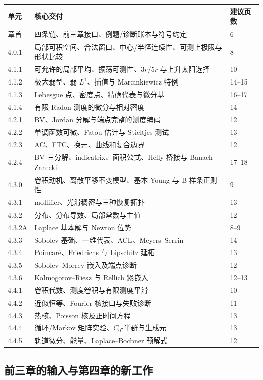 \documentclass[11pt,a4paper]{ctexart}
\begin{document}
\begin{longtable}{p{}p{}p{}}
\toprule
单元 & 核心交付 & 建议页数\\
\midrule
章首 & 四条链、前三章接口、例题/诊断账本与符号约定 & 6\\
4.0.1 & 局部可积空间、合法窗口、中心/半径连续性、可测上极限与形状比较 & 8\\
4.1.1 & 可允许的局部平均、振荡可测性、$3r/5r$ 与上升太阳选择 & 10\\
4.1.2 & 极大弱型、弱 $L^1$、插值与 Marcinkiewicz 特例 & 14--15\\
4.1.3 & Lebesgue 点、密度点、精确代表与微分基 & 16--17\\
4.1.4 & 有限 Radon 测度的微分与相对密度 & 14\\
4.2.1 & BV、Jordan 分解与端点完整的测度编码 & 12\\
4.2.2 & 单调函数可微、Fatou 估计与 Stieltjes 测试 & 13\\
4.2.3 & AC、FTC、换元、曲线和复合边界 & 12\\
4.2.4 & BV 三分解、indicatrix、面积公式、Helly 桥接与 Banach--Zarecki & 17--18\\
4.3.0 & 卷积动机、离散平移不变模型、基本 Young 与 B 样条正则性 & 9\\
4.3.1 & mollifier、光滑稠密与三种恢复拓扑 & 13\\
4.3.2 & 分布、分布导数、局部常数与主值 & 12\\
4.3.2A & Laplace 基本解与 Newton 位势 & 8--9\\
4.3.3 & Sobolev 基础、一维代表、ACL、Meyers--Serrin & 14\\
4.3.4 & Poincar\'e、Friedrichs 与 Lipschitz 延拓 & 13\\
4.3.5 & Sobolev--Morrey 嵌入及端点诊断 & 12\\
4.3.6 & Kolmogorov--Riesz 与 Rellich 紧嵌入 & 12--13\\
4.4.1 & 卷积代数、测度卷积与有限测度平滑 & 10\\
4.4.2 & 近似恒等、Fourier 核接口与失败诊断 & 11\\
4.4.3 & 热核、Poisson 核及正时间方程 & 13\\
4.4.4 & 循环/Markov 矩阵实验、$C_0$-半群与生成元 & 13\\
4.4.5 & 轨道微分、能量、Laplace--Bochner 预解式 & 12\\
\bottomrule
\end{longtable}

\subsection{前三章的输入与第四章的新工作}
\end{document}

